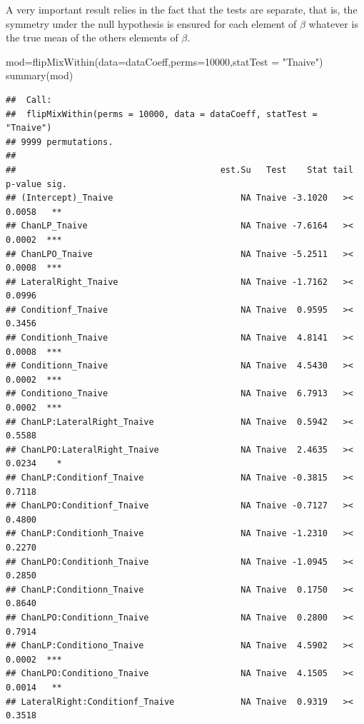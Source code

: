 \documentclass[
]{article}
\newenvironment{Shaded}{\begin{snugshade}}{\end{snugshade}}
\newcommand{\AttributeTok}[1]{\textcolor[rgb]{0.77,0.63,0.00}{#1}}
\newcommand{\DecValTok}[1]{\textcolor[rgb]{0.00,0.00,0.81}{#1}}
\newcommand{\FunctionTok}[1]{\textcolor[rgb]{0.00,0.00,0.00}{#1}}
\newcommand{\NormalTok}[1]{#1}
\newcommand{\OtherTok}[1]{\textcolor[rgb]{0.56,0.35,0.01}{#1}}
\newcommand{\StringTok}[1]{\textcolor[rgb]{0.31,0.60,0.02}{#1}}
\begin{document}
A very important result relies in the fact that the tests are separate,
that is, the symmetry under the null hypothesis is ensured for each
element of \(\beta\) whatever is the true mean of the others elements of
\(\beta\).

\begin{Shaded}
\begin{Highlighting}[]
\NormalTok{mod}\OtherTok{=}\FunctionTok{flipMixWithin}\NormalTok{(}\AttributeTok{data=}\NormalTok{dataCoeff,}\AttributeTok{perms=}\DecValTok{10000}\NormalTok{,}\AttributeTok{statTest =} \StringTok{"Tnaive"}\NormalTok{)}
\FunctionTok{summary}\NormalTok{(mod)}
\end{Highlighting}
\end{Shaded}

\begin{verbatim}
##  Call:
##  flipMixWithin(perms = 10000, data = dataCoeff, statTest = "Tnaive") 
## 9999 permutations.
## 
##                                        est.Su   Test    Stat tail p-value sig.
## (Intercept)_Tnaive                         NA Tnaive -3.1020   ><  0.0058   **
## ChanLP_Tnaive                              NA Tnaive -7.6164   ><  0.0002  ***
## ChanLPO_Tnaive                             NA Tnaive -5.2511   ><  0.0008  ***
## LateralRight_Tnaive                        NA Tnaive -1.7162   ><  0.0996     
## Conditionf_Tnaive                          NA Tnaive  0.9595   ><  0.3456     
## Conditionh_Tnaive                          NA Tnaive  4.8141   ><  0.0008  ***
## Conditionn_Tnaive                          NA Tnaive  4.5430   ><  0.0002  ***
## Conditiono_Tnaive                          NA Tnaive  6.7913   ><  0.0002  ***
## ChanLP:LateralRight_Tnaive                 NA Tnaive  0.5942   ><  0.5588     
## ChanLPO:LateralRight_Tnaive                NA Tnaive  2.4635   ><  0.0234    *
## ChanLP:Conditionf_Tnaive                   NA Tnaive -0.3815   ><  0.7118     
## ChanLPO:Conditionf_Tnaive                  NA Tnaive -0.7127   ><  0.4800     
## ChanLP:Conditionh_Tnaive                   NA Tnaive -1.2310   ><  0.2270     
## ChanLPO:Conditionh_Tnaive                  NA Tnaive -1.0945   ><  0.2850     
## ChanLP:Conditionn_Tnaive                   NA Tnaive  0.1750   ><  0.8640     
## ChanLPO:Conditionn_Tnaive                  NA Tnaive  0.2800   ><  0.7914     
## ChanLP:Conditiono_Tnaive                   NA Tnaive  4.5902   ><  0.0002  ***
## ChanLPO:Conditiono_Tnaive                  NA Tnaive  4.1505   ><  0.0014   **
## LateralRight:Conditionf_Tnaive             NA Tnaive  0.9319   ><  0.3518     

\end{verbatim}
\end{document}
